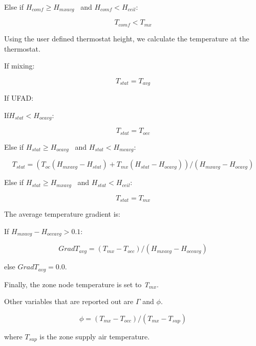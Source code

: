{Else if \({H_{comf}} \ge {H_{mxavg}}\) ~and \({H_{comf}} < {H_{ceil}}\):

\begin{equation}
{T_{comf}} < {T_{mx}}
\end{equation}

Using the user defined thermostat height, we calculate the temperature at the thermostat.

If mixing:

\begin{equation}
{T_{stat}} = {T_{avg}}
\end{equation}

If UFAD:

If\({H_{stat}} < {H_{ocavg}}\):

\begin{equation}
{T_{stat}} = {T_{occ}}
\end{equation}

Else if \({H_{stat}} \ge {H_{ocavg}}\) ~and \({H_{stat}} < {H_{mcavg}}\):

\begin{equation}
{T_{stat}} = \left( {{T_{oc}}\left( {{H_{mxavg}} - {H_{stat}}} \right) + {T_{mx}}\left( {{H_{stat}} - {H_{ocavg}}} \right)} \right)/\left( {{H_{mxavg}} - {H_{ocavg}}} \right)
\end{equation}

Else if \({H_{stat}} \ge {H_{mxavg}}\) ~and \({H_{stat}} < {H_{ceil}}\):

\begin{equation}
{T_{stat}} = {T_{mx}}
\end{equation}

The average temperature gradient is:

If \({H_{mxavg}} - {H_{occavg}} > 0.1\):

\begin{equation}
Grad{T_{avg}} = ({T_{mx}} - {T_{occ}})/({H_{mxavg}} - {H_{occavg}})
\end{equation}

else \(Grad{T_{avg}} = 0.0\).

Finally, the zone node temperature is set to \emph{T\(_{mx}\)}.

Other variables that are reported out are \(\Gamma\) and \(\phi\).

\begin{equation}
\phi  = ({T_{mx}} - {T_{occ}})/({T_{mx}} - {T_{sup}})
\end{equation}

where \({T_{sup}}\) is the zone supply air temperature.

}
